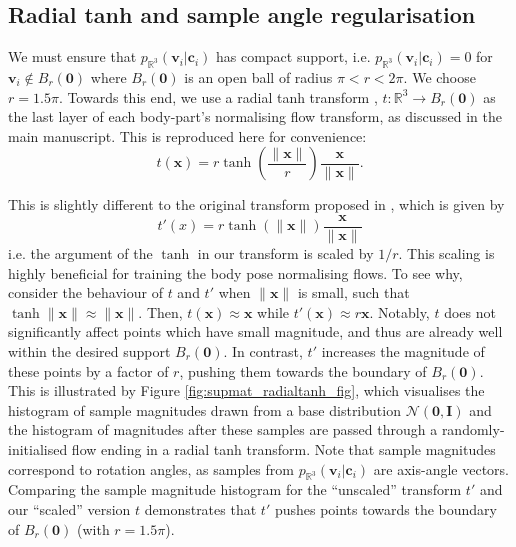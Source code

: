 \subsection{Radial tanh and sample angle regularisation}

We must ensure that $p_{\mathbb{R}^3}(\mathbf{v}_i | \mathbf{c}_i)$ has compact support, i.e. $p_{\mathbb{R}^3}(\mathbf{v}_i | \mathbf{c}_i) = 0$ for $\mathbf{v}_i \notin B_r(\mathbf{0})$ where $B_r(\mathbf{0})$ is an open ball of radius $\pi < r < 2\pi$. We choose $r=1.5\pi$. Towards this end, we use a radial tanh transform \cite{falorsi2019reparameterizing}, $t: \mathbb{R}^3 \rightarrow B_r(\mathbf{0})$ as the last layer of each body-part's normalising flow transform, as discussed in the main manuscript. This is reproduced here for convenience:
\begin{equation}
\label{eqn:supmat_radial_tanh}
    t(\mathbf{x}) = r \tanh\left(\frac{\|\mathbf{x}\|}{r}\right)\frac{\mathbf{x}}{\|\mathbf{x}\|}.
\end{equation}

This is slightly different to the original transform proposed in \cite{falorsi2019reparameterizing}, which is given by
\begin{equation}
\label{eqn:supmat_unscaled_radial_tanh}
    t'(x) = r \tanh\left(\|\mathbf{x}\|\right)\frac{\mathbf{x}}{\|\mathbf{x}\|} 
\end{equation}
i.e. the argument of the $\tanh$ in our transform is scaled by $1/r$. This scaling is highly beneficial for training the body pose normalising flows. To see why, consider the behaviour of $t$ and $t'$ when $\|\mathbf{x}\|$ is small, such that $\tanh\|\mathbf{x}\| \approx \|\mathbf{x}\| $. Then, $t(\mathbf{x}) \approx \mathbf{x}$ while $t'(\mathbf{x}) \approx r\mathbf{x}$. Notably, $t$ does not significantly affect points which have small magnitude, and thus are already well within the desired support $B_r(\mathbf{0})$. In contrast, $t'$ increases the magnitude of these points by a factor of $r$, pushing them towards the boundary of $B_r(\mathbf{0})$. This is illustrated by Figure \ref{fig:supmat_radialtanh_fig}, which visualises the histogram of sample magnitudes drawn from a base distribution $\mathcal{N}(\mathbf{0}, \mathbf{I})$ and the histogram of magnitudes after these samples are passed through a randomly-initialised flow ending in a radial tanh transform. Note that sample magnitudes correspond to rotation angles, as samples from $p_{\mathbb{R}^3}(\mathbf{v}_i | \mathbf{c}_i)$ are axis-angle vectors. Comparing the sample magnitude histogram for the ``unscaled'' transform \cite{falorsi2019reparameterizing} $t'$ and our ``scaled'' version $t$ demonstrates that $t'$ pushes points towards the boundary of $B_r(\mathbf{0})$ (with $r=1.5\pi$).

